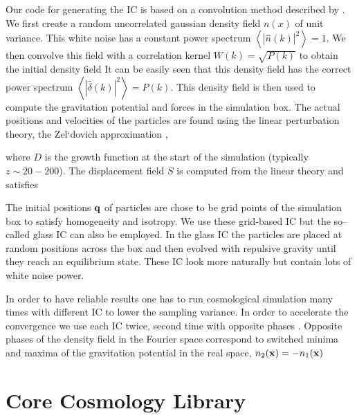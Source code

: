 Our code for generating the IC is based on a convolution method described by \textcite{1997ApJ...490L.127P}. We first create a random uncorrelated gaussian density field $n(x)$ of unit variance. This white noise has a constant power spectrum $\left\langle|\hat n(k)|^2\right\rangle=1$. We then convolve this field with a correlation kernel $W(k)=\sqrt{P(k)}$ to obtain the initial  density field
It can be easily seen that this density field has the correct power spectrum $\left\langle|\hat\delta(k)|^2\right\rangle=P(k)$. This density field is then used to compute the gravitation potential and forces in the simulation box. The actual positions and velocities of the particles are found using the linear perturbation theory, the Zel`dovich approximation \parencite{1970A&A.....5...84Z},
\begin{sloppypar}
where $D$ is the growth function at the start of the simulation (typically ${z\sim20-200}$). The displacement field $S$ is computed from the linear theory and satisfies
\end{sloppypar}
The initial positions $\mathbf q$ of particles are chose to be grid points of the simulation box to satisfy homogeneity and isotropy. We use these grid-based IC but the so--called glass IC can also be employed. In the glass IC the particles are placed at random positions across the box and then evolved with repulsive gravity until they reach an equilibrium state. These IC look more naturally but contain lots of white noise power.

In order to have reliable results one has to run cosmological simulation many times with different IC to lower the sampling variance. In order to accelerate the convergence we use each IC twice, second time with opposite phases \parencite{PhysRevD.93.103519}. Opposite phases of the density field in the Fourier space correspond to switched minima and maxima of the gravitation potential in the real space, $n_2(\mathbf x)=-n_1(\mathbf x)$

\section{Core Cosmology Library}

